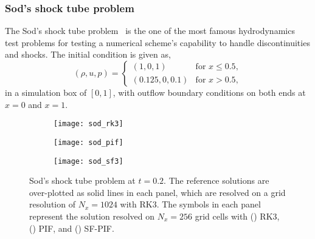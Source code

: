 \documentclass[times,preprint,3p]{elsarticle}
\begin{document}
\subsubsection{Sod's shock tube problem}

The Sod's shock tube problem~\cite{sod1978survey} is the one of the most famous hydrodynamics
test problems for testing a numerical scheme's capability to handle discontinuities and shocks.
The initial condition is given as,
\begin{equation}\label{eq:sod-init}
    \left( \rho, u, p \right) = \begin{cases}
        \left( 1, 0, 1 \right) & \text{for } x \le 0.5, \\
        \left( 0.125, 0, 0.1 \right) & \text{for } x > 0.5,
    \end{cases}
\end{equation}
in a simulation box of \( [0, 1] \), with outflow boundary conditions
on both ends at \( x = 0 \) and \( x = 1 \).

\begin{figure}[ht!]
    \centering
    \begin{subfigure}{80mm}
        \centering
        \texttt{[image: sod\_rk3]}
        \caption{}\label{subfig:sod_rk3}
    \end{subfigure}
    \begin{subfigure}{80mm}
        \centering
        \texttt{[image: sod\_pif]}
        \caption{}\label{subfig:sod_pif}
    \end{subfigure}
    \begin{subfigure}{80mm}
        \centering
        \texttt{[image: sod\_sf3]}
        \caption{}\label{subfig:sod_sf3}
    \end{subfigure}
    \caption{Sod's shock tube problem at \( t = 0.2 \). The reference solutions are over-plotted
        as solid lines in each panel, which are resolved on a grid resolution of \( N_{x} = 1024 \)
        with RK3. The symbols in each panel represent the solution resolved on
        \( N_{x} = 256 \) grid cells with
        (\protect{}) RK3,
        (\protect{}) PIF, and (\protect{}) SF-PIF\@.
    }\label{fig:1d-sod}
\end{figure}
\end{document}
